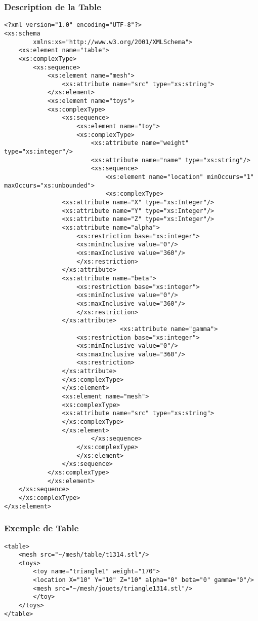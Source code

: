 \clearpage
\subsubsection{Description de la Table}
 \begin{lstlisting}[caption=Description de la Table, label=desctable]
<?xml version="1.0" encoding="UTF-8"?>
<xs:schema
        xmlns:xs="http://www.w3.org/2001/XMLSchema">
    <xs:element name="table">
    <xs:complexType>
        <xs:sequence>
            <xs:element name="mesh">
                <xs:attribute name="src" type="xs:string">
            </xs:element>
            <xs:element name="toys">
            <xs:complexType>
                <xs:sequence>
                    <xs:element name="toy">
                    <xs:complexType>
                        <xs:attribute name="weight" type="xs:integer"/>
                        <xs:attribute name="name" type="xs:string"/>
                        <xs:sequence>
                            <xs:element name="location" minOccurs="1" maxOccurs="xs:unbounded">
                            <xs:complexType>
				<xs:attribute name="X" type="xs:Integer"/>
				<xs:attribute name="Y" type="xs:Integer"/>
				<xs:attribute name="Z" type="xs:Integer"/>
				<xs:attribute name="alpha">
				    <xs:restriction base="xs:integer">
					<xs:minInclusive value="0"/>
					<xs:maxInclusive value="360"/>
				    </xs:restriction> 
				</xs:attribute>
				<xs:attribute name="beta">
				    <xs:restriction base="xs:integer">
					<xs:minInclusive value="0"/>
					<xs:maxInclusive value="360"/>
				    </xs:restriction>
				</xs:attribute>
                                <xs:attribute name="gamma">
				    <xs:restriction base="xs:integer">
					<xs:minInclusive value="0"/>
					<xs:maxInclusive value="360"/>
				    <xs:restriction>
				</xs:attribute>
			    </xs:complexType>
			    </xs:element>
			    <xs:element name="mesh">
			    <xs:complexType>
				<xs:attribute name="src" type="xs:string">
			    </xs:complexType>
			    </xs:element>
                        </xs:sequence>
                    </xs:complexType>
                    </xs:element>
                </xs:sequence>
            </xs:complexType>
            </xs:element>
	</xs:sequence>
    </xs:complexType>
</xs:element>
\end{lstlisting}
  
\subsubsection{Exemple de Table}
\begin{lstlisting}[caption=Exemple de table, label=desctable]
<table>
    <mesh src="~/mesh/table/t1314.stl"/>
	<toys>
	    <toy name="triangle1" weight="170">
		<location X="10" Y="10" Z="10" alpha="0" beta="0" gamma="0"/>
		<mesh src="~/mesh/jouets/triangle1314.stl"/>
	    </toy>
	</toys>
</table>
\end{lstlisting}
